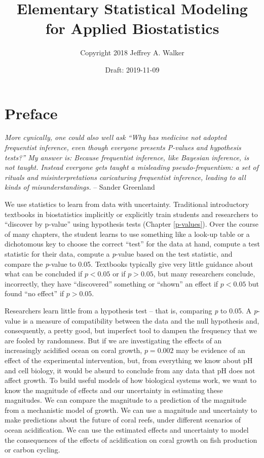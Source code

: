 \documentclass[]{book}
\title{Elementary Statistical Modeling for Applied Biostatistics}
\author{Copyright 2018 Jeffrey A. Walker}
\date{Draft: 2019-11-09}
\begin{document}
\maketitle

{
\setcounter{tocdepth}{1}
\tableofcontents
}
\chapter*{Preface}\label{preface}

\emph{More cynically, one could also well ask ``Why has medicine not
adopted frequentist inference, even though everyone presents P-values
and hypothesis tests?'' My answer is: Because frequentist inference,
like Bayesian inference, is not taught. Instead everyone gets taught a
misleading pseudo-frequentism: a set of rituals and misinterpretations
caricaturing frequentist inference, leading to all kinds of
misunderstandings.} -- Sander Greenland

We use statistics to learn from data with uncertainty. Traditional
introductory textbooks in biostatistics implicitly or explicitly train
students and researchers to ``discover by p-value'' using hypothesis
tests (Chapter \ref{p-values}). Over the course of many chapters, the
student learns to use something like a look-up table or a dichotomous
key to choose the correct ``test'' for the data at hand, compute a test
statistic for their data, compute a \emph{p}-value based on the test
statistic, and compare the \emph{p}-value to 0.05. Textbooks typically
give very little guidance about what can be concluded if \(p < 0.05\) or
if \(p > 0.05\), but many researchers conclude, incorrectly, they have
``discovered'' something or ``shown'' an effect if \(p < 0.05\) but
found ``no effect'' if \(p > 0.05\).

Researchers learn little from a hypothesis test -- that is, comparing
\emph{p} to 0.05. A \emph{p}-value is a measure of compatibility between
the data and the null hypothesis and, consequently, a pretty good, but
imperfect tool to dampen the frequency that we are fooled by randomness.
But if we are investigating the effects of an increasingly acidified
ocean on coral growth, \(p=0.002\) may be evidence of an effect of the
experimental intervention, but, from everything we know about pH and
cell biology, it would be absurd to conclude from any data that pH does
not affect growth. To build useful models of how biological systems
work, we want to know the magnitude of effects and our uncertainty in
estimating these magnitudes. We can compare the magnitude to a
prediction of the magnitude from a mechanistic model of growth. We can
use a magnitude and uncertainty to make predictions about the future of
coral reefs, under different scenarios of ocean acidification. We can
use the estimated effects and uncertainty to model the consequences of
the effects of acidification on coral growth on fish production or
carbon cycling.
\end{document}
